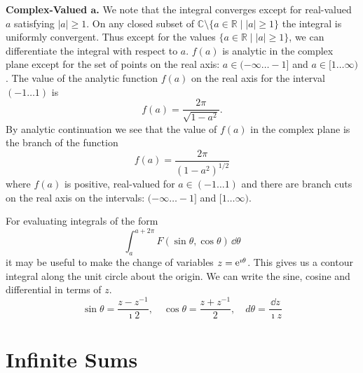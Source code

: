 \begin{Example}
  \textbf{Complex-Valued $\mathbf{a}$.}
  We note that the integral converges except for real-valued $a$
  satisfying $|a| \geq 1$.  On any closed subset of 
  $\mathbb{C} \setminus \{ a \in \mathbb{R} \mid |a| \geq 1 \}$ the integral is uniformly
  convergent.
  Thus except for the values $\{ a \in \mathbb{R} \mid |a| \geq 1 \}$, 
  we can differentiate
  the integral with respect to $a$.  $f(a)$ is analytic in the complex
  plane except for the set of points on the  real axis: 
  $a \in (-\infty \ldots -1]$ and $a \in [1 \ldots \infty)$.
  The value of the analytic function $f(a)$ on the real axis for the 
  interval $(-1 \ldots 1)$ is 
  \[ 
  f(a) = \frac{2\pi}{\sqrt{1-a^2}}.
  \]
  By analytic continuation we see that the value of $f(a)$ in the complex 
  plane is the branch of the function
  \[ 
  f(a) = \frac{2\pi}{(1-a^2)^{1/2}}
  \]
  where $f(a)$ is positive, real-valued for $a \in (-1 \ldots 1)$  and there
  are branch cuts on the real axis on the intervals:
  $(-\infty \ldots -1]$ and $[1 \ldots \infty)$.
\end{Example}












\begin{Result}
  For evaluating integrals of the form
  \[
  \int_a^{a + 2 \pi} F( \sin \theta, \cos \theta ) \,\dd \theta
  \]
  it may be useful to make the change of variables $z = \mathop{\mathrm{e}}\nolimits^{\imath \theta}$.  This gives us 
  a contour integral along the unit circle about the origin.  We can write
  the sine, cosine and differential in terms of $z$.
  \[
  \sin \theta = \frac{z-z^{-1}}{\imath 2},\quad \cos \theta = \frac{z+z^{-1}}{2},
  \quad d\theta = \frac{\dd z}{\imath z}
  \]
\end{Result}











\section{Infinite Sums}



